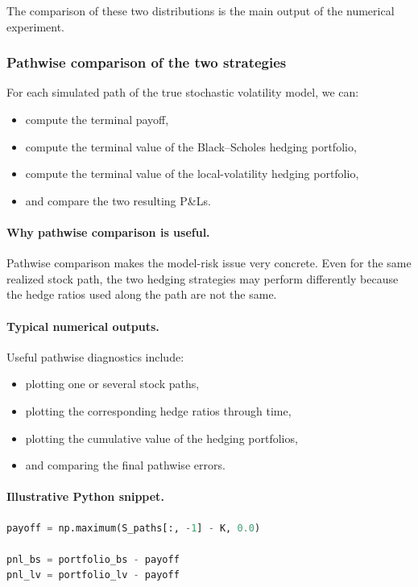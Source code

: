 \documentclass[11pt]{article}
\theoremstyle{plain}
\theoremstyle{definition}
\theoremstyle{remark}
\begin{document}
The comparison of these two distributions is the main output of the
numerical experiment.

\subsubsection{Pathwise comparison of the two strategies}

For each simulated path of the true stochastic volatility model, we can:
\begin{itemize}[leftmargin=1.4em]
    \item compute the terminal payoff,
    \item compute the terminal value of the Black--Scholes hedging
    portfolio,
    \item compute the terminal value of the local-volatility hedging
    portfolio,
    \item and compare the two resulting P\&Ls.
\end{itemize}

\paragraph{Why pathwise comparison is useful.}
Pathwise comparison makes the model-risk issue very concrete.
Even for the same realized stock path, the two hedging strategies may
perform differently because the hedge ratios used along the path are not
the same.

\paragraph{Typical numerical outputs.}
Useful pathwise diagnostics include:
\begin{itemize}[leftmargin=1.4em]
    \item plotting one or several stock paths,
    \item plotting the corresponding hedge ratios through time,
    \item plotting the cumulative value of the hedging portfolios,
    \item and comparing the final pathwise errors.
\end{itemize}

\paragraph{Illustrative Python snippet.}
\begin{lstlisting}[language=Python]
payoff = np.maximum(S_paths[:, -1] - K, 0.0)

pnl_bs = portfolio_bs - payoff
pnl_lv = portfolio_lv - payoff
\end{lstlisting}
\end{document}

